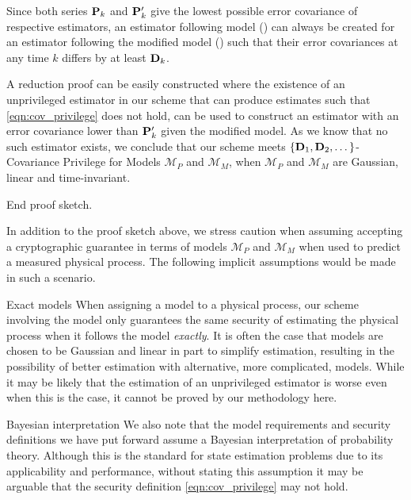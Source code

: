 \documentclass[conference]{IEEEtran}
\theoremstyle{definition}
\theoremstyle{definition}
\theoremstyle{remark}
\begin{document}
Since both series ${{\mathbf{P}}}_k$ and ${{\mathbf{P}}}^\prime_k$ give the lowest possible error covariance of respective estimators, an estimator following model () can always be created for an estimator following the modified model () such that their error covariances at any time $k$ differs by at least ${{\mathbf{D}}}_k$.

A reduction proof can be easily constructed where the existence of an unprivileged estimator in our scheme that can produce estimates such that \eqref{eqn:cov_privilege} does not hold, can be used to construct an estimator with an error covariance lower than ${{\mathbf{P}}}^\prime_k$ given the modified model. As we know that no such estimator exists, we conclude that our scheme meets $\{{{\mathbf{D}}}_1,{{\mathbf{D}}}_2,\dots\}$-Covariance Privilege for Models $\mathcal{M}_P$ and $\mathcal{M}_M$, when $\mathcal{M}_P$ and $\mathcal{M}_M$ are Gaussian, linear and time-invariant.

End proof sketch.

In addition to the proof sketch above, we stress caution when assuming accepting a cryptographic guarantee in terms of models $\mathcal{M}_P$ and $\mathcal{M}_M$ when used to predict a measured physical process. The following implicit assumptions would be made in such a scenario.
\begin{LaTeXdescription}
   \item[Exact models] When assigning a model to a physical process, our scheme involving the model only guarantees the same security of estimating the physical process when it follows the model \textit{exactly}. It is often the case that models are chosen to be Gaussian and linear in part to simplify estimation, resulting in the possibility of better estimation with alternative, more complicated, models. While it may be likely that the estimation of an unprivileged estimator is worse even when this is the case, it cannot be proved by our methodology here.
   \item[Bayesian interpretation] We also note that the model requirements and security definitions we have put forward assume a Bayesian interpretation of probability theory. Although this is the standard for state estimation problems due to its applicability and performance, without stating this assumption it may be arguable that the security definition \ref{eqn:cov_privilege} may not hold.
\end{LaTeXdescription}

% 
% 
\end{document}
